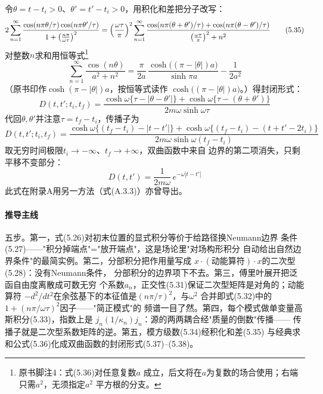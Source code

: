 令$\theta=t-t_{i}>0$、$\theta'=t'-t_{i}>0$，用积化和差把分子改写：
\begin{equation*}
2\sum_{n=1}^{\infty}
\frac{\cos(n\pi\theta/\tau)\cos(n\pi\theta'/\tau)}
{1+\bigl(\frac{n\pi}{\omega\tau}\bigr)^{2}}
=\Bigl(\frac{\omega\tau}{\pi}\Bigr)^{2}\sum_{n=1}^{\infty}
\frac{\cos(n\pi(\theta+\theta')/\tau)+\cos(n\pi(\theta-\theta')/\tau)}
{\bigl(\frac{\omega\tau}{\pi}\bigr)^{2}+n^{2}}
\tag{5.35}
\end{equation*}
对整数$n$求和用恒等式\footnote{原书脚注4：式(5.36)对任意复数$a$
成立，后文将在$a$为复数的场合使用；右端只需$a^{2}$，无须指定$a^{2}$
平方根的分支。}
\begin{equation*}
\sum_{n=1}^{\infty}\frac{\cos(n\theta)}{a^{2}+n^{2}}
=\frac{\pi}{2a}\,\frac{\cosh\bigl((\pi-|\theta|)a\bigr)}{\sinh\pi a}
-\frac{1}{2a^{2}}
\tag{5.36}
\end{equation*}
（原书印作$\cosh(\pi-|\theta|)a$，按恒等式读作
$\cosh\bigl((\pi-|\theta|)a\bigr)$。）得封闭形式：
\begin{equation*}
D(t,t';t_{i},t_{f})
=\frac{\cosh\omega\{\tau-|\theta-\theta'|\}
+\cosh\omega\{\tau-(\theta+\theta')\}}
{2m\omega\sinh\omega\tau}
\tag{5.37}
\end{equation*}
代回$\theta,\theta'$并注意$\tau=t_{f}-t_{i}$，传播子为
\begin{equation*}
D(t,t';t_{i},t_{f})=
\frac{\cosh\omega\{(t_{f}-t_{i})-|t-t'|\}
+\cosh\omega\{(t_{f}-t_{i})-(t+t'-2t_{i})\}}
{2m\omega\sinh\omega(t_{f}-t_{i})}
\tag{5.38}
\end{equation*}
取无穷时间极限$t_{i}\to-\infty$、$t_{f}\to+\infty$，双曲函数中来自
边界的第二项消失，只剩平移不变部分：
\begin{equation*}
D(t,t')=\frac{1}{2m\omega}\,e^{-\omega|t-t'|}
\tag{5.39}
\end{equation*}
此式在附录A用另一方法（式(A.3.3)）亦曾导出。

\paragraph{推导主线}
五步。第一，式(5.26)对初末位置的显式积分等价于给路径换Neumann边界
条件(5.27)——"积分掉端点"="放开端点"，这是场论里"对场构形积分
自动给出自然边界条件"的最简实例。第二，分部积分把作用量写成
$x\cdot(\text{动能算符})\cdot x$的二次型(5.28)：没有Neumann条件，
分部积分的边界项下不去。第三，傅里叶展开把泛函自由度离散成可数无穷
个系数$a_{n}$，正交性(5.31)保证二次型矩阵是对角的；动能算符
$-d^{2}/dt^{2}$在余弦基下的本征值是$(n\pi/\tau)^{2}$，与$\omega^{2}$
合并即式(5.32)中的$1+(n\pi/\omega\tau)^{2}$因子——"简正模式"的
频谱一目了然。第四，每个模式做单变量高斯积分(5.33)，指数上是
$j_{n}(1/\kappa_{n})j_{n}$：源的两两耦合经"质量的倒数"传播——
传播子就是二次型系数矩阵的逆。第五，模方级数(5.34)经积化和差(5.35)
与经典求和公式(5.36)化成双曲函数的封闭形式(5.37)--(5.38)。

